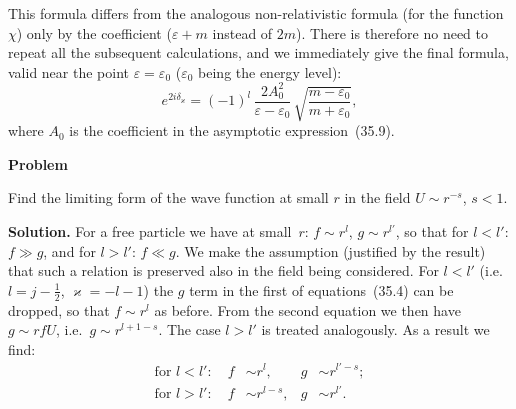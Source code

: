 This formula differs from the analogous non-relativistic formula (for the function $\chi$) only by the coefficient ($\varepsilon + m$ instead of $2m$). There is therefore no need to repeat all the subsequent calculations, and we immediately give the final formula, valid near the point $\varepsilon = \varepsilon_0$ ($\varepsilon_0$ being the energy level):
\begin{equation}
e^{2i\delta_\varkappa} = (-1)^l\,\frac{2A_0^2}{\varepsilon - \varepsilon_0}\,\sqrt{\frac{m - \varepsilon_0}{m + \varepsilon_0}},
\tag{35.11}
\end{equation}
where $A_0$ is the coefficient in the asymptotic expression~(35.9).

\begin{center}
\textbf{Problem}
\end{center}

Find the limiting form of the wave function at small $r$ in the field $U \sim r^{-s}$, $s < 1$.

\textbf{Solution.} For a free particle we have at small~$r$: $f \sim r^l$, $g \sim r^{l'}$, so that for $l < l'$: $f \gg g$, and for $l > l'$: $f \ll g$. We make the assumption (justified by the result) that such a relation is preserved also in the field being considered. For $l < l'$ (i.e.\ $l = j - \tfrac{1}{2}$, $\varkappa = -l-1$) the $g$ term in the first of equations~(35.4) can be dropped, so that $f \sim r^l$ as before. From the second equation we then have $g \sim rfU$, i.e.\ $g \sim r^{l+1-s}$. The case $l > l'$ is treated analogously. As a result we find:
\[
\begin{aligned}
\text{for } l < l'\!: \quad f &\sim r^l, & g &\sim r^{l'-s};\\
\text{for } l > l'\!: \quad f &\sim r^{l-s}, & g &\sim r^{l'}.
\end{aligned}
\]
